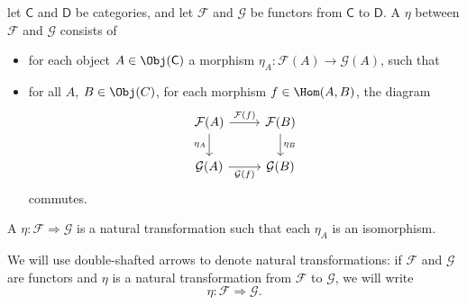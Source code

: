 \documentclass[notes.tex]{subfiles}
\begin{document}
\begin{definition}
  \label{def:naturaltransformation}
  let $\mathsf{C}$ and $\mathsf{D}$ be categories, and let $\mathcal{F}$ and $\mathcal{G}$ be functors from $\mathsf{C}$ to $\mathsf{D}$. A  $\eta$ between $\mathcal{F}$ and $\mathcal{G}$ consists of
  \begin{itemize}
    \item for each object $A \in \Obj(\mathsf{C})$ a morphism $\eta_{A}\colon \mathcal{F}(A) \to \mathcal{G}(A)$, such that
    \item for all $A$, $B \in \Obj(C)$, for each morphism $f \in \Hom(A,B)$, the diagram
      \begin{equation*}
        \begin{tikzcd}
          \mathcal{F}(A)\arrow[d, swap, "\eta_{A}"] \arrow[r, "\mathcal{F}(f)"] & \mathcal{F}(B)\arrow[d, "\eta_{B}"] \\
          \mathcal{G}(A) \arrow[r, swap, "\mathcal{G}(f)"] & \mathcal{G}(B)
        \end{tikzcd}
      \end{equation*}
      commutes.
  \end{itemize}
\end{definition}

\begin{definition}
  \label{def:naturalisomorphism}
  A  $\eta\colon \mathcal{F} \Rightarrow \mathcal{G}$ is a natural transformation such that each $\eta_{A}$ is an isomorphism.
\end{definition}

\begin{notation}
  We will use double-shafted arrows to denote natural transformations: if $\mathcal{F}$ and $\mathcal{G}$ are functors and $\eta$ is a natural transformation from $\mathcal{F}$ to $\mathcal{G}$, we will write
  \begin{equation*}
    \eta\colon \mathcal{F} \Rightarrow \mathcal{G}.
  \end{equation*}
\end{notation}
\end{document}
